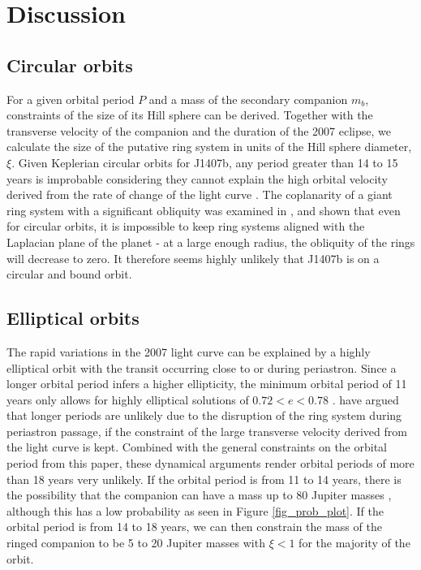 \documentclass[twocolumn]{aa}
\begin{document}
\section{Discussion}
\subsection{Circular orbits}

For a given orbital period $P$ and a mass of the secondary companion $m_b$, constraints of the size of its Hill sphere can be derived.
%
Together with the transverse velocity of the companion and the duration of the 2007 eclipse, we calculate the size of the putative ring system in units of the Hill sphere diameter, $\xi$.
%
Given Keplerian circular orbits for J1407b, any period greater than 14 to 15 years is improbable considering they cannot explain the high orbital velocity derived from the rate of change of the light curve \citep{Mamajek12,Kenworthy15}.
%
The coplanarity of a giant ring system with a significant obliquity was examined in \citet{Zanazzi17}, and shown that even for circular orbits, it is impossible to keep ring systems aligned with the Laplacian plane of the planet - at a large enough radius, the obliquity of the rings will decrease to zero.
%
It therefore seems highly unlikely that J1407b is on a circular and bound orbit.

\subsection{Elliptical orbits}

The rapid variations in the 2007 light curve can be explained by a highly elliptical orbit with the transit occurring close to or during periastron.
%
Since a longer orbital period infers a higher ellipticity, the minimum orbital period of 11 years only allows for highly elliptical solutions of $0.72<e<0.78$ \citep{Kenworthy15}.
%
\citet{vanWerkhoven14} have argued that longer periods are unlikely due to the disruption of the ring system during periastron passage, if the constraint of the large transverse velocity derived from the light curve is kept.
%
Combined with the general constraints on the orbital period from this paper, these dynamical arguments render orbital periods of more than 18 years very unlikely.
%
If the orbital period is from 11 to 14 years, there is the possibility that the companion can have a mass up to 80 Jupiter masses \citep{Kenworthy15}, although this has a low probability as seen in Figure \ref{fig_prob_plot}.
%
If the orbital period is from 14 to 18 years, we can then constrain the mass of the ringed companion to be 5 to 20 Jupiter masses with $\xi<1$ for the majority of the orbit.
\end{document}
